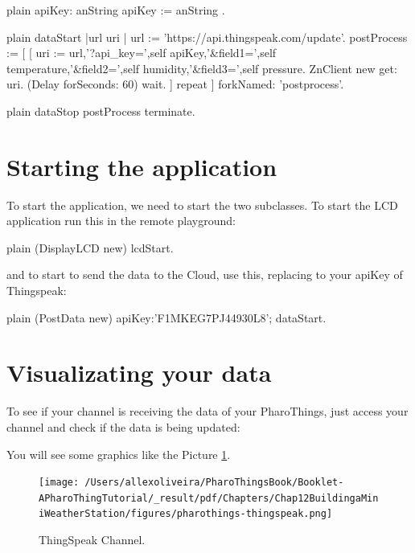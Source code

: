 \documentclass[10pt,twoside,english]{_support/latex/sbabook/sbabook}
\begin{document}
\begin{displaycode}{plain}
apiKey: anString    
    apiKey := anString .
\end{displaycode}

\begin{displaycode}{plain}
dataStart
    |url uri |
    url := 'https://api.thingspeak.com/update'.
    postProcess :=  [ [        
        uri := url,'?api_key=',self apiKey,'&field1=',self temperature,'&field2=',self humidity,'&field3=',self pressure.
        ZnClient new get: uri.
    (Delay forSeconds: 60) wait. 
    ] repeat ] forkNamed: 'postprocess'. 
\end{displaycode}

\begin{displaycode}{plain}
dataStop
    postProcess terminate. 
\end{displaycode}
\section{Starting the application}
To start the application, we need to start the two subclasses. To start the LCD application run this in the remote playground:

\begin{displaycode}{plain}
(DisplayLCD new) lcdStart.
\end{displaycode}

and to start to send the data to the Cloud, use this, replacing to your apiKey of Thingspeak:

\begin{displaycode}{plain}
(PostData new) apiKey:'F1MKEG7PJ44930L8'; dataStart.
\end{displaycode}
\section{Visualizating your data}
To see if your channel is receiving the data of your PharoThings, just access your channel and check if the data is being updated:


You will see some graphics like the Picture \ref{ThingspeakChannel}. 


\begin{figure}

\begin{center}
\texttt{[image: /Users/allexoliveira/PharoThingsBook/Booklet-APharoThingTutorial/\_result/pdf/Chapters/Chap12BuildingaMiniWeatherStation/figures/pharothings-thingspeak.png]}\caption{ThingSpeak Channel.\label{ThingspeakChannel}}\end{center}
\end{figure}




\backmatter

\end{document}
